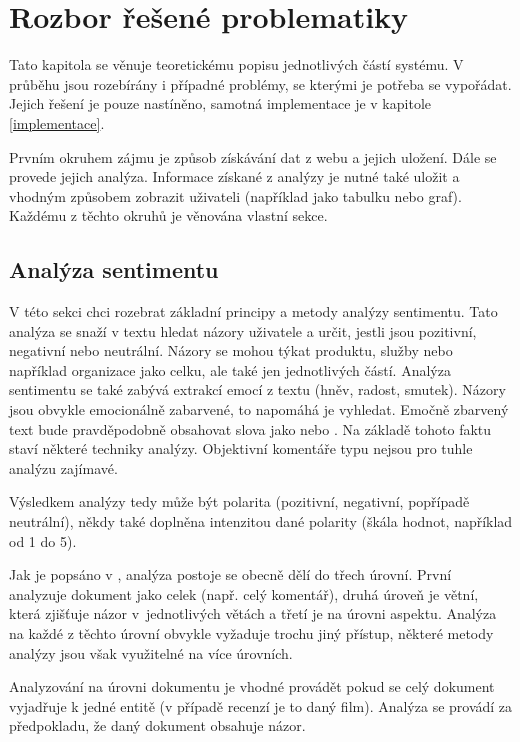 \chapter{Rozbor řešené problematiky} 
\label{teorie}

Tato kapitola se věnuje teoretickému popisu jednotlivých částí systému. V průběhu jsou rozebírány i případné problémy, se kterými je potřeba se vypořádat. Jejich řešení je pouze nastíněno, samotná implementace je v kapitole \ref{implementace}. 

Prvním okruhem zájmu je způsob získávání dat z webu a jejich uložení. Dále se provede jejich analýza. Informace získané z analýzy je nutné také uložit a vhodným způsobem zobrazit uživateli (například jako tabulku nebo graf). Každému z těchto okruhů je věnována vlastní sekce. 

\section{Analýza sentimentu}
V této sekci chci rozebrat základní principy a metody analýzy sentimentu. Tato analýza se snaží v textu hledat názory uživatele a určit, jestli jsou pozitivní, negativní nebo neutrální. Názory se mohou týkat produktu, služby nebo například organizace jako celku, ale také jen jednotlivých částí. Analýza sentimentu se také zabývá extrakcí emocí z textu (hněv, radost, smutek). Názory jsou obvykle emocionálně zabarvené, to napomáhá je vyhledat. Emočně zbarvený text bude pravděpodobně obsahovat slova jako  nebo . Na základě tohoto faktu staví některé techniky analýzy. Objektivní komentáře typu  nejsou pro tuhle analýzu zajímavé.

Výsledkem analýzy tedy může být polarita (pozitivní, negativní, popřípadě neutrální), někdy také doplněna intenzitou dané polarity (škála hodnot, například od 1 do 5).

Jak je popsáno v \cite{veselovska-2017}, analýza postoje se obecně dělí do třech úrovní. První analyzuje dokument jako celek (např. celý komentář), druhá úroveň je větní, která zjišťuje názor v~jednotlivých větách a třetí je na úrovni aspektu.
Analýza na každé z těchto úrovní obvykle vyžaduje trochu jiný přístup, některé metody analýzy jsou však využitelné na více úrovních. 

Analyzování na úrovni dokumentu je vhodné provádět pokud se celý dokument vyjadřuje k jedné entitě (v případě recenzí je to daný film). Analýza se provádí za předpokladu, že daný dokument obsahuje názor.

